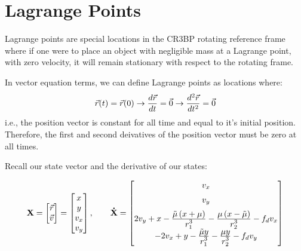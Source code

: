 \section{Lagrange Points}

Lagrange points are special locations in the CR3BP rotating reference frame where if one were to place an object with negligible mass at a Lagrange point, with zero velocity, it will remain stationary with respect to the rotating frame.

\vspace{\baselineskip}

In vector equation terms, we can define Lagrange points as locations where:
\begin{equation*}
    \vec{r}(t) = \vec{r}(0) \rightarrow \frac{d\vec{r}}{dt} = \vec{0} \rightarrow \frac{d^2\vec{r}}{dt^2} = \vec{0}
\end{equation*}
i.e., the position vector is constant for all time and equal to it's initial position. Therefore, the first and second deivatives of the position vector must be zero at all times.

\vspace{\baselineskip}

Recall our state vector and the derivative of our states:

\begin{equation*}
    \bf{X}
    = \begin{bmatrix}
        \vec{r} \\
        \vec{v}
    \end{bmatrix}
    = \begin{bmatrix}
        x   \\
        y   \\
        v_x \\
        v_y
    \end{bmatrix},
    \qquad \dot{\bf{X}} =
    \begin{bmatrix}
        v_x                                                                                                                  \\[0.2cm]
        v_y                                                                                                                  \\[0.2cm]
        2v_y + x - \frac{\displaystyle \tilde{\mu} \left(x+\mu\right)}{\displaystyle r_1^3} - \frac{\displaystyle \mu \left(x-\tilde{\mu}\right)}{\displaystyle r_2^3} - f_d v_x \\[0.2cm]
        -2v_x + y - \frac{\displaystyle \tilde{\mu}y}{\displaystyle r_1^3} - \frac{\displaystyle \mu y}{\displaystyle r_2^3} - f_d v_y
    \end{bmatrix}
\end{equation*}

